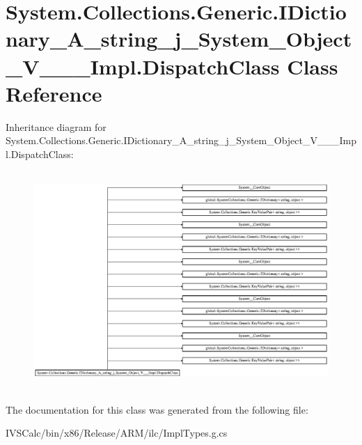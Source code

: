 \hypertarget{class_system_1_1_collections_1_1_generic_1_1_i_dictionary___a__string__j___system___object___v_______impl_1_1_dispatch_class}{}\section{System.\+Collections.\+Generic.\+I\+Dictionary\+\_\+\+A\+\_\+string\+\_\+j\+\_\+\+System\+\_\+\+Object\+\_\+\+V\+\_\+\+\_\+\+\_\+\+Impl.\+Dispatch\+Class Class Reference}
\label{class_system_1_1_collections_1_1_generic_1_1_i_dictionary___a__string__j___system___object___v_______impl_1_1_dispatch_class}
Inheritance diagram for System.\+Collections.\+Generic.\+I\+Dictionary\+\_\+\+A\+\_\+string\+\_\+j\+\_\+\+System\+\_\+\+Object\+\_\+\+V\+\_\+\+\_\+\+\_\+\+Impl.\+Dispatch\+Class\+:\begin{figure}[H]
\begin{center}
\leavevmode
\includegraphics[height=8.327138cm]{class_system_1_1_collections_1_1_generic_1_1_i_dictionary___a__string__j___system___object___v_______impl_1_1_dispatch_class}
\end{center}
\end{figure}


The documentation for this class was generated from the following file\+:\begin{DoxyCompactItemize}
\item 
I\+V\+S\+Calc/bin/x86/\+Release/\+A\+R\+M/ilc/Impl\+Types.\+g.\+cs\end{DoxyCompactItemize}
